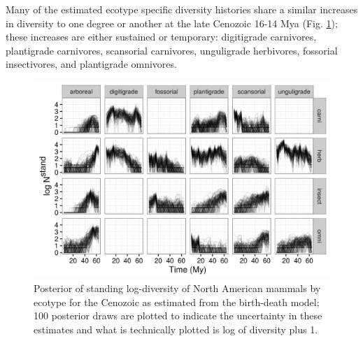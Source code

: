\documentclass[12pt,letterpaper]{article}
\begin{document}
Many of the estimated ecotype specific diversity histories share a similar increases in diversity to one degree or another at the late Cenozoic 16-14 Mya (Fig. \ref{fig:ecotype_diversity}); these increases are either sustained or temporary: digitigrade carnivores, plantigrade carnivores, scansorial carnivores, unguligrade herbivores, fossorial insectivores, and plantigrade omnivores.

\begin{figure}[ht]
  \centering
  \includegraphics[width=\textwidth,height=0.4\textheight,keepaspectratio=true]{figure/ecotype_diversity}
  \caption[Estimated mammal ecotype log-diversity for the Cenozoic]{Posterior of standing log-diversity of North American mammals by ecotype for the Cenozoic as estimated from the birth-death model; 100 posterior draws are plotted to indicate the uncertainty in these estimates and what is technically plotted is log of diversity plus 1.}
  \label{fig:ecotype_diversity}
\end{figure}
\end{document}

